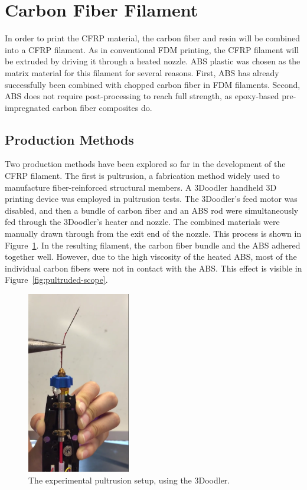 \section{Carbon Fiber Filament}

In order to print the CFRP material, the carbon fiber and resin will be combined into a CFRP filament. As in conventional FDM printing, the CFRP filament will be extruded by driving it through a heated nozzle. ABS plastic was chosen as the matrix material for this filament for several reasons. First, ABS has already successfully been combined with chopped carbon fiber in FDM filaments. Second, ABS does not require post-processing to reach full strength, as epoxy-based pre-impregnated carbon fiber composites do. 

\subsection{Production Methods}

Two production methods have been explored so far in the development of the CFRP filament. The first is pultrusion, a fabrication method widely used to manufacture fiber-reinforced structural members. A 3Doodler handheld 3D printing device was employed in pultrusion tests. The 3Doodler's feed motor was disabled, and then a bundle of carbon fiber and an ABS rod were simultaneously fed through the 3Doodler's heater and nozzle. The combined materials were manually drawn through from the exit end of the nozzle. This process is shown in Figure~\ref{fig:pultrusion-vid}. In the resulting filament, the carbon fiber bundle and the ABS adhered together well. However, due to the high viscosity of the heated ABS, most of the individual carbon fibers were not in contact with the ABS. This effect is visible in Figure~\ref{fig:pultruded-scope}.

\begin{figure}[htp]
    \centering
    \includegraphics[width=0.4\textwidth]{./figures/pultrusion-vid}
    \caption{The experimental pultrusion setup, using the 3Doodler.}
    \label{fig:pultrusion-vid}
\end{figure}

